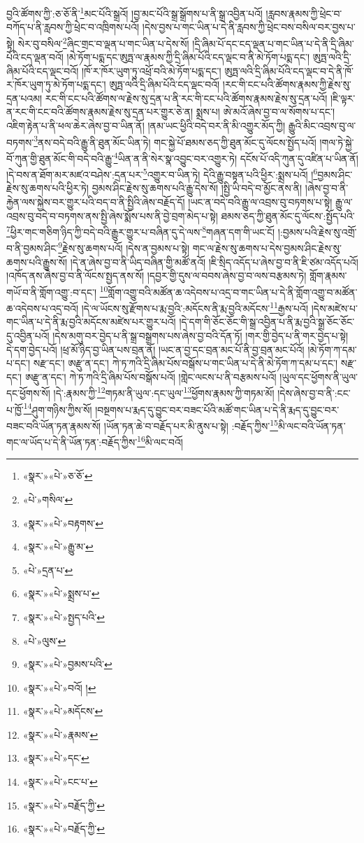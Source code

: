 བྱའི་ཚོགས་ཀྱི་:ཅ་ཅོ་ནི་\footnote{«སྣར་»«པེ་»ཅ་ཅོ་}མང་པོའི་སྒྲའོ། །བྱ་མང་པོའི་སྒྲ་སྒྲོགས་པ་ནི་སྒྲ་འབྱིན་པའོ། །རླབས་རྣམས་ཀྱི་ཕྲེང་བ་བཀོད་པ་ནི་རླབས་ཀྱི་ཕྲེང་བ་འཁྲིགས་པའོ། །དེས་བྱས་པ་གང་ཡིན་པ་དེ་ནི་རླབས་ཀྱི་ཕྲེང་བས་བསིལ་བར་བྱས་པ་སྟེ། སེར་བུ་བསིལ་\footnote{«པེ་»གསིལ་}ཞིང་གྲང་བ་ལྡན་པ་གང་ཡིན་པ་དེས་སོ། །དྲི་ཞིམ་པོ་དང་ངད་ལྡན་པ་གང་ཡིན་པ་དེ་ནི་དྲི་ཞིམ་པོའི་ངད་ལྡན་བའོ། །མེ་ཏོག་པདྨ་དང་ཨུཏྤ་ལ་རྣམས་ཀྱི་དྲི་ཞིམ་པོའི་ངད་ལྡང་བ་ནི་མེ་ཏོག་པདྨ་དང་། ཨུཏྤ་ལའི་དྲི་ཞིམ་པོའི་ངད་ལྡང་བའོ། །ཁོ་ར་ཁོར་ཡུག་ཏུ་འཕྲོ་བའི་མེ་ཏོག་པདྨ་དང་། ཨུཏྤ་ལའི་དྲི་ཞིམ་པོའི་ངད་ལྡང་བ་དེ་ནི་ཁོ་ར་ཁོར་ཡུག་ཏུ་མེ་ཏོག་པདྨ་དང་། ཨུཏྤ་ལའི་དྲི་ཞིམ་པོའི་ངད་ལྡང་བའོ། །རང་གི་ངང་པའི་ཚོགས་རྣམས་ཀྱི་རྗེས་སུ་དྲན་པའམ། རང་གི་ངང་པའི་ཚོགས་ལ་རྗེས་སུ་དྲན་པ་ནི་རང་གི་ངང་པའི་ཚོགས་རྣམས་རྗེས་སུ་དྲན་པའོ། །ཇི་ལྟར་ན་རང་གི་ངང་བའི་ཚོགས་རྣམས་རྗེས་སུ་དྲན་པར་གྱུར་ཅེ་ན། སྨྲས་པ། ཨེ་མའོ་ཞེས་བྱ་བ་ལ་སོགས་པ་དང་། འཇིག་རྟེན་པ་ནི་ཕལ་ཆེར་ཞེས་བྱ་བ་ཡིན་ནོ། །ནམ་ཡང་ཕྱིའི་བདེ་བར་ནི་མི་འགྱུར་མོད་ཀྱི། རྒྱུའི་མིང་འབྲས་བུ་ལ་བཏགས་\footnote{«སྣར་»«པེ་»བརྟགས་}ནས་བདེ་བའི་རྒྱུ་ནི་ཐུན་མོང་ཡིན་ཏེ། གང་སྐྱེ་པོ་ཐམས་ཅད་ཀྱི་ཐུན་མོང་དུ་ལོངས་སྤྱོད་པའོ། །གལ་ཏེ་སྐྱེ་བོ་ཀུན་གྱི་ཐུན་མོང་གི་བདེ་བའི་རྒྱུ་\footnote{«སྣར་»«པེ་»རྒྱུ་མ་}ཡིན་ན་ནི་སེར་སྣ་འབྱུང་བར་འགྱུར་ཏེ། དངོས་པོ་འདི་ཀུན་དུ་འཛིན་པ་ཡིན་ནོ། །དེ་བས་ན་ཐོག་མར་མཛའ་བཤེས་:དྲན་པར་\footnote{«པེ་»དྲན་པ་}འགྱུར་བ་ཡིན་ཏེ། དེའི་རྒྱུ་བསྟན་པའི་ཕྱིར་:སྨྲས་པའོ། །\footnote{«སྣར་»«པེ་»སྨྲས་པ་}བྱམས་ཤིང་རྗེས་སུ་ཆགས་པའི་ཕྱིར་ཏེ། བྱམས་ཤིང་རྗེས་སུ་ཆགས་པའི་རྒྱུ་དེས་སོ། །སྤྱི་ཡི་བདེ་བ་མྱོང་ནས་ནི། །ཞེས་བྱ་བ་ནི་རྐྱེན་ལས་སྐྱེས་བར་གྱུར་པའི་བད་བ་ནི་སྤྱིའི་ཞེས་བརྗོད་དོ། །ཡང་ན་བདེ་བའི་རྒྱུ་ལ་འབྲས་བུ་བཏགས་པ་སྟེ། རྒྱུ་ལ་འབྲས་བུ་བདེ་བ་བཏགས་ནས་སྤྱི་ཞེས་སྨོས་པས་ནི་བྱེ་བྲག་མེད་པ་སྟེ། ཐམས་ཅད་ཀྱི་ཐུན་མོང་དུ་ལོངས་:སྤྱོད་པའི་\footnote{«སྣར་»«པེ་»སྤྱད་པའི་}ཕྱིར་གང་གཅིག་ཉིད་ཀྱི་བདེ་བའི་རྒྱུར་གྱུར་པ་བཞིན་དུ་དེ་ལས་\footnote{«པེ་»ལུས་}གཞན་དག་གི་ཡང་ངོ། །:བྱམས་པའི་རྗེས་སུ་འགྲོ་བ་ནི་བྱམས་ཤིང་\footnote{«སྣར་»«པེ་»བྱམས་པའི་}རྗེས་སུ་ཆགས་པའོ། །དེས་ན་བྱམས་པ་སྟེ། གང་ལ་རྗེས་སུ་ཆགས་པ་དེས་བྱམས་ཤིང་རྗེས་སུ་ཆགས་པའི་རྒྱུས་སོ། །དེ་ན་ཞེས་བྱ་བ་ནི་ཡིད་བཞིན་གྱི་མཚོ་ནའོ། །ཇི་སྲིད་འདོད་པ་ཞེས་བྱ་བ་ནི་ཇི་ཙམ་འདོད་པའོ། །འཁོད་ནས་ཞེས་བྱ་བ་ནི་ལོངས་སྤྱད་ནས་སོ། །དབྱར་གྱི་དུས་ལ་བབས་ཞེས་བྱ་བ་ལས་བརྩམས་ཏེ། གློག་རྣམས་གཡོ་བ་ནི་གློག་འགྱུ་:བ་དང་། \footnote{«སྣར་»«པེ་»བའོ། ། }གློག་འགྱུ་བའི་མཚོན་ཆ་འདེབས་པ་འདྲ་བ་གང་ཡིན་པ་དེ་ནི་གློག་འགྱུ་བ་མཚོན་ཆ་འདེབས་པ་འདྲ་བའོ། །དེ་ལ་ཡོངས་སུ་རྫོགས་པ་རྨ་བྱའི་:མདོངས་ནི་རྨ་བྱའི་མདོངས་\footnote{«སྣར་»«པེ་»མདོངས་}རྒྱས་པའོ། །དེས་མཛེས་པ་གང་ཡིན་པ་དེ་ནི་རྨ་བྱའི་མདོངས་མཛེས་པར་གྱུར་པའོ། །དེ་དག་གི་ཅོང་ཅོང་གི་སྒྲ་འབྱིན་པ་ནི་རྨ་བྱའི་སྒྲ་ཅོང་ཅོང་དུ་འབྱིན་པའོ། །དེས་མགུ་བར་བྱེད་པ་ནི་སྒྲ་བསྒྲགས་པས་ཞེས་བྱ་བའི་དོན་ཏོ། །གར་གྱི་བྱེད་པ་ནི་གར་བྱེད་པ་སྟེ། དེ་དག་བྱེད་པའོ། །ཕྲ་མོ་ཉིད་བྱ་ཡིན་པས་བྲན་ནོ། །ཡང་ན་བྱ་དང་བྲན་མང་པོ་ནི་བྱ་བྲན་མང་པོའོ། །མེ་ཏོག་ཀ་དམ་པ་དང་། སརྫ་དང་། ཨརྫུ་ན་དང་། ཀེ་ཏ་ཀའི་དྲི་ཞིམ་པོས་བསྒོས་པ་གང་ཡིན་པ་དེ་ནི་མེ་ཏོག་ཀ་དམ་པ་དང་། སརྫ་དང་། ཨརྫུ་ན་དང་། ཀེ་ཏ་ཀའི་དྲི་ཞིམ་པོས་བསྒོས་པའོ། །གླེང་ལངས་པ་ནི་བརྩམས་པའོ། །ཡུལ་དང་ཕྱོགས་ནི་ཡུལ་དང་ཕྱོགས་སོ། །དེ་:རྣམས་ཀྱི་\footnote{«སྣར་»«པེ་»རྣམས་}གཏམ་ནི་ཡུལ་:དང་ཡུལ་\footnote{«སྣར་»«པེ་»དང་}ཕྱོགས་རྣམས་ཀྱི་གཏམ་མོ། །དེས་ཞེས་བྱ་བ་ནི་:ངང་པ་ཁྱོ་\footnote{«སྣར་»«པེ་»ངང་པ་}ཤུག་གཉིས་ཀྱིས་སོ། །བསྔགས་པ་རྨད་དུ་བྱུང་བར་བཟང་པོའི་མཚོ་གང་ཡིན་པ་དེ་ནི་རྨད་དུ་བྱུང་བར་བཟང་བའི་ཡོན་ཏན་རྣམས་སོ། །ཡོན་ཏན་ཆེ་བ་བརྗོད་པར་མི་ནུས་པ་སྟེ། :བརྗོད་ཀྱིས་\footnote{«སྣར་»«པེ་»བརྗོད་ཀྱི་}མི་ལང་བའི་ཡོན་ཏན་གང་ལ་ཡོད་པ་དེ་ནི་ཡོན་ཏན་:བརྗོད་ཀྱིས་\footnote{«སྣར་»«པེ་»བརྗོད་ཀྱི་}མི་ལང་བའོ། 